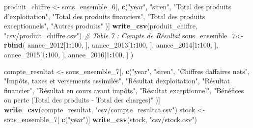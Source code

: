 \documentclass[mstat,12pt]{unswthesis}
\newenvironment{Shaded}{\begin{snugshade}}{\end{snugshade}}
\newcommand{\CommentTok}[1]{\textcolor[rgb]{0.56,0.35,0.01}{\textit{#1}}}
\newcommand{\DecValTok}[1]{\textcolor[rgb]{0.00,0.00,0.81}{#1}}
\newcommand{\FunctionTok}[1]{\textcolor[rgb]{0.13,0.29,0.53}{\textbf{#1}}}
\newcommand{\NormalTok}[1]{#1}
\newcommand{\OtherTok}[1]{\textcolor[rgb]{0.56,0.35,0.01}{#1}}
\newcommand{\SpecialCharTok}[1]{\textcolor[rgb]{0.81,0.36,0.00}{\textbf{#1}}}
\newcommand{\StringTok}[1]{\textcolor[rgb]{0.31,0.60,0.02}{#1}}
\begin{document}
\begin{Shaded}
\begin{Highlighting}[]
\NormalTok{produit\_chiffre }\OtherTok{\textless{}{-}}\NormalTok{ sous\_ensemble\_6[, }\FunctionTok{c}\NormalTok{(}\StringTok{"year"}\NormalTok{,}
  \StringTok{"siren"}\NormalTok{, }
  \StringTok{"Total des produits d’exploitation"}\NormalTok{, }
  \StringTok{"Total des produits financiers"}\NormalTok{, }
  \StringTok{"Total des produits exceptionnels"}\NormalTok{, }
  \StringTok{"Autres produits"}
\NormalTok{)]}
\FunctionTok{write\_csv}\NormalTok{(produit\_chiffre, }\StringTok{"csv/produit\_chiffre.csv"}\NormalTok{)}
\CommentTok{\# Table 7 : Compte de Résultat}
\NormalTok{sous\_ensemble\_7}\OtherTok{\textless{}{-}} \FunctionTok{rbind}\NormalTok{(}
\NormalTok{  annee\_2012[}\DecValTok{1}\SpecialCharTok{:}\DecValTok{100}\NormalTok{, ],}
\NormalTok{  annee\_2013[}\DecValTok{1}\SpecialCharTok{:}\DecValTok{100}\NormalTok{, ],}
\NormalTok{  annee\_2014[}\DecValTok{1}\SpecialCharTok{:}\DecValTok{100}\NormalTok{, ],}
\NormalTok{  annee\_2015[}\DecValTok{1}\SpecialCharTok{:}\DecValTok{100}\NormalTok{, ],}
\NormalTok{  annee\_2016[}\DecValTok{1}\SpecialCharTok{:}\DecValTok{100}\NormalTok{, ]}
\NormalTok{)}

\NormalTok{compte\_resultat }\OtherTok{\textless{}{-}}\NormalTok{ sous\_ensemble\_7[, }\FunctionTok{c}\NormalTok{(}\StringTok{"year"}\NormalTok{,}
  \StringTok{"siren"}\NormalTok{, }
  \StringTok{"Chiffres d\textquotesingle{}affaires nets"}\NormalTok{, }
  \StringTok{"Impôts, taxes et versements assimilés"}\NormalTok{, }
  \StringTok{"Résultat d\textquotesingle{}exploitation"}\NormalTok{, }
  \StringTok{"Résultat financier"}\NormalTok{, }
  \StringTok{"Résultat en cours avant impôts"}\NormalTok{, }
  \StringTok{"Résultat exceptionnel"}\NormalTok{, }
  \StringTok{"Bénéfices ou perte (Total des produits ‐ Total des charges)"}
\NormalTok{)]}
\FunctionTok{write\_csv}\NormalTok{(compte\_resultat, }\StringTok{"csv/compte\_resultat.csv"}\NormalTok{)}
\NormalTok{stock }\OtherTok{\textless{}{-}}\NormalTok{ sous\_ensemble\_7[ }\FunctionTok{c}\NormalTok{(}\StringTok{"year"}\NormalTok{)]}
\FunctionTok{write\_csv}\NormalTok{(stock, }\StringTok{"csv/stock.csv"}\NormalTok{)}
\end{Highlighting}
\end{Shaded}

\normalsize
\end{document}
